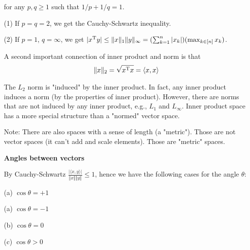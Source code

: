 for any $p, q\geq 1$ such that $1/p+1/q=1$.

(1) If $p=q=2$, we get the Cauchy-Schwartz inequality.

(2) If $p=1$, $q=\infty$, we get $\vert x^{{\rm T}}y\vert\leq \Vert x\Vert_{1}\Vert y\Vert_{\infty}=(\sum_{k=1}^{n}\vert x_{k}\vert)(\max_{k\in [n]}x_{k})$.


\vspace{0.5cm}
A second important connection of inner product and norm is that
$$\Vert x\Vert_{2}=\sqrt{x^{{\rm T}} x}=\langle x,x\rangle$$

The $L_{2}$ norm is "induced" by the inner product. In fact, any inner product induces a norm (by the properties of inner product). However, there are norms that are not induced by any inner product, e.g., $L_{1}$ and $L_{\infty}$. Inner product space has a more special structure than a "normed" vector space.

\begin{figure}
	\centering
	\resizebox{7.5cm}{3cm}{}
	\caption{}
	\label{}
\end{figure}

Note: There are also spaces with a sense of length (a "metric"). Those are not vector spaces (it can't add and scale elements). Those are "metric" spaces.

\vspace{0.5cm}
\noindent\textbf{Angles between vectors}

By Cauchy-Schwartz $\frac{\vert \langle x,y\rangle\vert}{\Vert x\Vert \Vert y\Vert}\leq 1$, hence we have the following cases for the angle $\theta$:

\begin{marginfigure}
	\centering
	\resizebox{7.5cm}{3cm}{}
	\caption{(a) $\cos\theta = +1$}
	\label{}
\end{marginfigure}

\begin{marginfigure}
	\centering
	\resizebox{7.5cm}{3cm}{}
	\caption{(a) $\cos\theta = -1$}
	\label{}
\end{marginfigure}

\begin{marginfigure}
	\centering
	\resizebox{7.5cm}{3cm}{}
	\caption{(b) $\cos\theta = 0$}
	\label{}
\end{marginfigure}

\begin{marginfigure}
	\centering
	\resizebox{7.5cm}{3cm}{}
	\caption{(c) $\cos\theta>0$}
	\label{}
\end{marginfigure}

